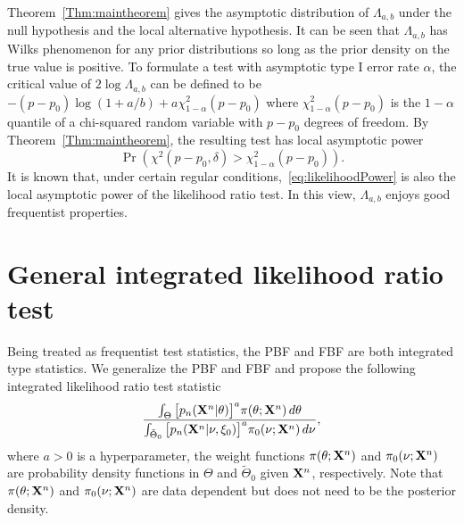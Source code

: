 \documentclass[11pt]{article}
\theoremstyle{plain}
\theoremstyle{definition}
\theoremstyle{remark}
\begin{document}
Theorem~\ref{Thm:maintheorem} gives the asymptotic distribution of $\Lambda_{a,b}$ under the null hypothesis and the local alternative hypothesis.
It can be seen that $\Lambda_{a,b}$ has Wilks phenomenon for any prior distributions so long as the prior density on the true value is positive.
To formulate a test with asymptotic type I error rate $\alpha$, the critical value of $2\log \Lambda_{a,b}$ can be defined to be $-(p-p_0)\log (1+a/b)+ a\chi^2_{1-\alpha}(p-p_0)$ where $\chi^2_{1-\alpha}(p-p_0)$ is the $1-\alpha$ quantile of a chi-squared random variable with $p-p_0$ degrees of freedom.
By Theorem~\ref{Thm:maintheorem}, the resulting test has local asymptotic power
\begin{equation}\label{eq:likelihoodPower}
\Pr \left( \chi^2(p-p_0,\delta)> \chi^2_{1-\alpha}(p-p_0) \right).
\end{equation}
It is known that, under certain regular conditions,~\eqref{eq:likelihoodPower} is also the local asymptotic power of the likelihood ratio test. 
In this view, $\Lambda_{a,b}$ enjoys good frequentist properties.





\section{General integrated likelihood ratio test}

 Being treated as frequentist test statistics, the PBF and FBF are both integrated type statistics.
 We generalize the PBF and FBF and propose the following integrated likelihood ratio test statistic
\begin{equation*}
    \frac{\int_{\Theta} \big[p_n(\mathbf{X}^{n}|\theta)\big]^{a}\pi(\theta;\mathbf{X}^{n})\,d\theta}{\int_{\tilde{\Theta}_0} \big[p_n(\mathbf{X}^{n}|\nu,\xi_0)\big]^{a}\pi_0(\nu;\mathbf{X}^{n})\,d\nu},
\end{equation*}
where $a>0$ is a hyperparameter,
the weight functions $\pi(\theta;\mathbf{X}^{n})$ and $\pi_0(\nu;\mathbf{X}^{n})$ are probability density functions in $\Theta$ and $\tilde{\Theta}_0$ given $\mathbf{X}^{n}$, respectively.
Note that $\pi(\theta;\mathbf{X}^{n})$ and $\pi_0(\nu;\mathbf{X}^{n})$ are data dependent but does not need to be the posterior density.
\end{document}

